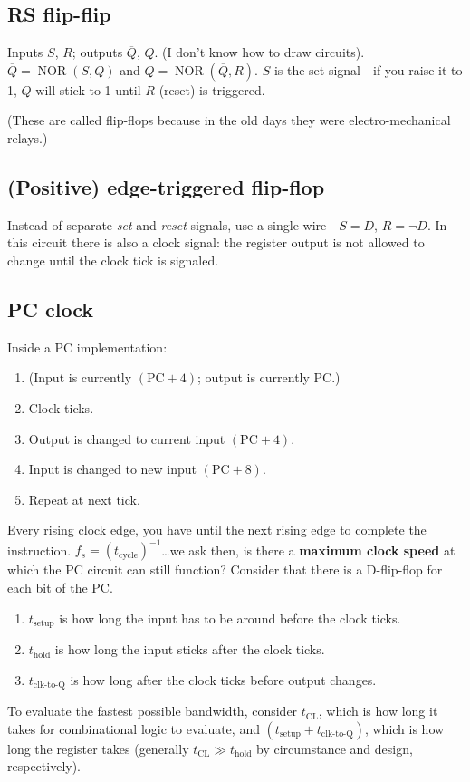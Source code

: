 \subsection{RS flip-flip}
Inputs \(S\), \(R\); outputs \(\overline{Q}\), \(Q\). (I don't know how to draw circuits). \(\overline{Q} = \operatorname{NOR}\left(S, Q\right)\) and \(Q = \operatorname{NOR}(\overline{Q}, R)\). \(S\) is the set signal---if you raise it to 1, \(Q\) will stick to 1 until \(R\) (reset) is triggered.

(These are called flip-flops because in the old days they were electro-mechanical relays.)

\subsection{(Positive) edge-triggered flip-flop}
Instead of separate \emph{set} and \emph{reset} signals, use a single wire---\(S = D\), \(R = \lnot D\). In this circuit there is also a clock signal: the register output is not allowed to change until the clock tick is signaled.

\subsection{PC clock}
Inside a PC implementation:
\begin{enumerate}
	\item (Input is currently \((\text{PC}+4)\); output is currently PC.)
	\item Clock ticks.
	\item Output is changed to current input \((\text{PC}+4)\).
	\item Input is changed to new input \((\text{PC}+8)\).
	\item Repeat at next tick.
\end{enumerate}

Every rising clock edge, you have until the next rising edge to complete the instruction. \(f_s = \left(t_\text{cycle}\right)^{-1}\)\ldots we ask then, is there a \textbf{maximum clock speed} at which the PC circuit can still function? Consider that there is a D-flip-flop for each bit of the PC.
\begin{enumerate}
	\item \(t_\text{setup}\) is how long the input has to be around before the clock ticks.
	\item \(t_\text{hold}\) is how long the input sticks after the clock ticks.
	\item \(t_\text{clk-to-Q}\) is how long after the clock ticks before output changes.
\end{enumerate}
To evaluate the fastest possible bandwidth, consider \(t_\text{CL}\), which is how long it takes for combinational logic to evaluate, and \(\left(t_\text{setup} + t_\text{clk-to-Q}\right)\), which is how long the register takes (generally \(t_\text{CL}\gg t_\text{hold}\) by circumstance and design, respectively).

